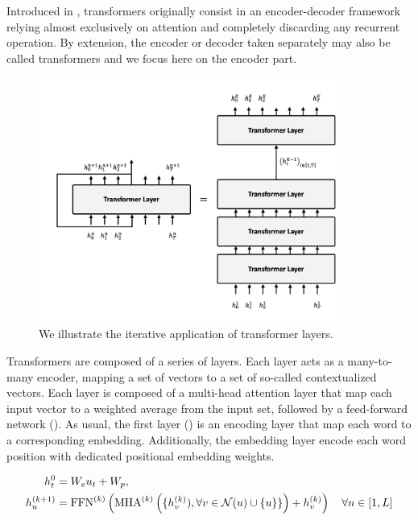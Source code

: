 Introduced in \textcite{vaswani_17}, transformers originally consist in an encoder-decoder framework relying almost exclusively on attention and completely discarding any recurrent operation. By extension, the encoder or decoder taken separately may also be called transformers and we focus here on the encoder part.

\begin{figure}[!ht]
	\includegraphics[width=10cm]{images/transformer_layer_unfold.png}
	\caption[RNN cell unfold]{We illustrate the iterative application of transformer layers.}
\end{figure}

Transformers are composed of a series of layers. Each layer acts as a many-to-many encoder, mapping a set of vectors to a set of so-called contextualized vectors. Each layer is composed of a multi-head attention layer that map each input vector to a weighted average from the input set, followed by a feed-forward network (). As usual, the first layer () is an encoding layer that map each word to a corresponding embedding. Additionally, the embedding layer encode each word position with dedicated positional embedding weights.


\begin{align}
    h^0_t &= W_eu_t + W_p, \labeq{transformers-emb}\\
    h^{(k+1)}_u &= \text{FFN}^{(k)}\left(\text{MHA}^{(k)}\left( \{h_v^{(k)}), \forall v \in \mathcal{N}(u) \cup \{u\}\}\right) + h_v^{(k)}\right) \quad \forall n \in [1, L] \labeq{transformers-layer}
\end{align}

